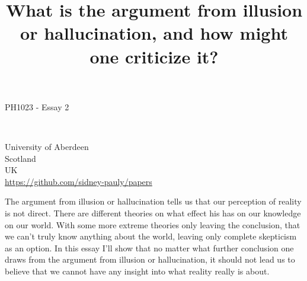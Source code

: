 \documentclass[fleqn,14pt]{article}
\begin{document}
\lstset{
  language=Python,
  basicstyle=\small,          %
  keywordstyle=\bfseries,
  identifierstyle=,           %
  commentstyle=,              %
  stringstyle=\ttfamily,      %
  showstringspaces=false,     %
  numbers=left,
  numberstyle=\tiny,
  numbersep=5pt,
  frame=tb,
}

\title{What is the argument from illusion or hallucination, and how might one criticize it?}
\date{}




\fancyhf{}



\begin{titlepage}
  \begin{center}
    \Large
    \textbf{\thetitle}
        
    \vspace{0.4cm}
    \large
    PH1023 - Essay 2
        
    \vspace{0.4cm}
    \textbf{\theauthor}\\
    \textbf{\theuoastudentid}

       
    \vfill


    University of Aberdeen\\
    Scotland\\
    UK\\
    \thedate
    \vspace{0.4cm}
    \url{https://github.com/sidney-pauly/papers}
  \end{center}
\end{titlepage}



The argument from illusion or hallucination tells us that our perception of reality is not direct. There are
different theories on what effect his has on our knowledge on our world. With some more extreme theories
only leaving the conclusion, that we can't truly know anything about the world, leaving only complete
skepticism as an option. In this essay I'll show that no matter what further conclusion one draws from the
argument from illusion or hallucination, it should not lead us to believe that we cannot have any insight
into what reality really is about.
\end{document}
